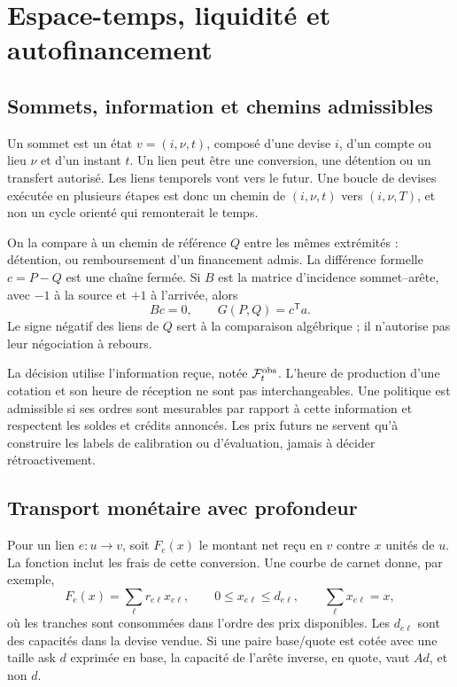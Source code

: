 \section{Espace-temps, liquidité et autofinancement}
\label{sec:ext-cash}

\subsection{Sommets, information et chemins admissibles}

Un sommet est un état \(v=(i,\nu,t)\), composé d'une devise \(i\), d'un compte ou lieu \(\nu\) et d'un instant \(t\). Un lien peut être une conversion, une détention ou un transfert autorisé. Les liens temporels vont vers le futur. Une boucle de devises exécutée en plusieurs étapes est donc un chemin de \((i,\nu,t)\) vers \((i,\nu,T)\), et non un cycle orienté qui remonterait le temps.

On la compare à un chemin de référence \(Q\) entre les mêmes extrémités : détention, ou remboursement d'un financement admis. La différence formelle \(c=P-Q\) est une chaîne fermée. Si \(B\) est la matrice d'incidence sommet--arête, avec \(-1\) à la source et \(+1\) à l'arrivée, alors
\begin{equation}
 Bc=0,\qquad G(P,Q)=c^{\mathsf T}a.
 \label{eq:ext-chain}
\end{equation}
Le signe négatif des liens de \(Q\) sert à la comparaison algébrique ; il n'autorise pas leur négociation à rebours.

La décision utilise l'information reçue, notée \(\mathcal F_t^{\rm obs}\). L'heure de production d'une cotation et son heure de réception ne sont pas interchangeables. Une politique est admissible si ses ordres sont mesurables par rapport à cette information et respectent les soldes et crédits annoncés. Les prix futurs ne servent qu'à construire les labels de calibration ou d'évaluation, jamais à décider rétroactivement.

\subsection{Transport monétaire avec profondeur}

Pour un lien \(e:u\to v\), soit \(F_e(x)\) le montant net reçu en \(v\) contre \(x\) unités de \(u\). La fonction inclut les frais de cette conversion. Une courbe de carnet donne, par exemple,
\begin{equation}
 F_e(x)=\sum_{\ell}r_{e\ell}x_{e\ell},\qquad
 0\le x_{e\ell}\le d_{e\ell},\qquad \sum_\ell x_{e\ell}=x,
 \label{eq:ext-depth}
\end{equation}
où les tranches sont consommées dans l'ordre des prix disponibles. Les \(d_{e\ell}\) sont des capacités dans la devise vendue. Si une paire base/quote est cotée avec une taille ask \(d\) exprimée en base, la capacité de l'arête inverse, en quote, vaut \(A d\), et non \(d\).

